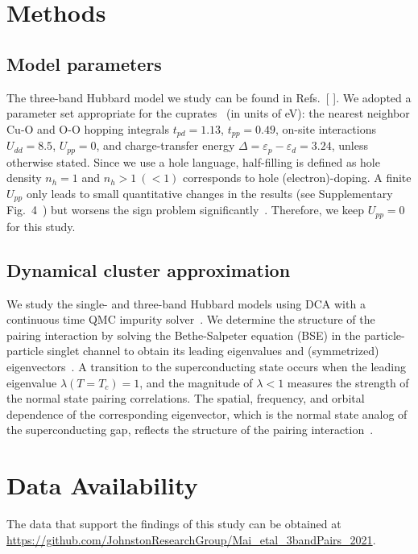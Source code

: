 \documentclass[fleqn,twocolumn,11pt]{wlscirep}
\newcommand{\onlinecite}[1]{\hspace{-1 ex} \nocite{#1}\citenum{#1}}
\begin{document}
\section*{Methods}
\subsection*{Model parameters}
The three-band Hubbard model we study can be found in Refs.~[\onlinecite{Kung,supplement}]. We adopted a parameter set appropriate for the cuprates~\cite{Kung,Czyzyk,Johnston,Ohta} (in units of eV): the nearest neighbor Cu-O and O-O hopping integrals $t_{pd} = 1.13$, $t_{pp} = 0.49$, on-site interactions $U_{dd} = 8.5$, $U_{pp} = 0$, and charge-transfer energy $\Delta = \varepsilon_p -\varepsilon_d = 3.24$, unless otherwise stated. Since we use a hole language, half-filling is defined as hole density $n_h=1$ and $n_h>1~(<1)$ corresponds to hole (electron)-doping. A finite $U_{pp}$ only leads to small quantitative changes in the results (see Supplementary Fig.~4~\cite{supplement}) but worsens the sign problem significantly~\cite{Kung}. Therefore, we keep $U_{pp}=0$ for this study.

\subsection*{Dynamical cluster approximation}
We study the single- and three-band Hubbard models using DCA with a continuous time QMC impurity solver~\cite{Jarrell,Maier1,Urs,Gull2,Gull3}. 
We determine the structure of the pairing interaction by solving the Bethe-Salpeter equation (BSE) in the particle-particle singlet channel to obtain its leading eigenvalues and (symmetrized) eigenvectors~\cite{supplement, Maier4PRL}. A transition to the superconducting state occurs when the leading eigenvalue $\lambda(T=T_c) = 1$, and the magnitude of $\lambda <1$ measures the strength of the normal state pairing correlations. The spatial, frequency, and orbital dependence of the corresponding eigenvector, which is the normal state analog of the superconducting gap, reflects the structure of the pairing interaction~\cite{Maier16,Maier4PRL}.

\section*{Data Availability} The data that support the findings of this study can be obtained at  \url{https://github.com/JohnstonResearchGroup/Mai_etal_3bandPairs_2021}.
\end{document}
